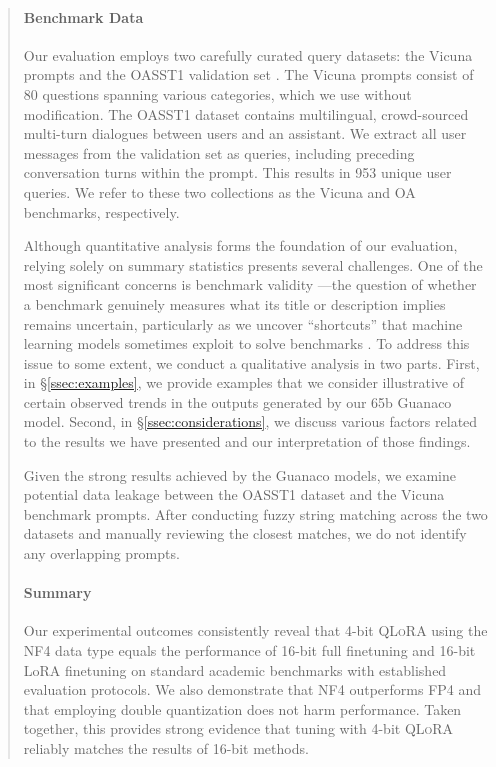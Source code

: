 \begin{quote}
\paragraph{Benchmark Data} Our evaluation employs two carefully curated query datasets: the Vicuna prompts \citep{vicuna2023} and the OASST1 validation set \citep{kopf2023openassistant}. The Vicuna prompts consist of 80 questions spanning various categories, which we use without modification. The OASST1 dataset contains multilingual, crowd-sourced multi-turn dialogues between users and an assistant. We extract all user messages from the validation set as queries, including preceding conversation turns within the prompt. This results in 953 unique user queries. We refer to these two collections as the Vicuna and OA benchmarks, respectively.

Although quantitative analysis forms the foundation of our evaluation, relying solely on summary statistics presents several challenges. One of the most significant concerns is benchmark validity \citep{liao2021we}—the question of whether a benchmark genuinely measures what its title or description implies remains uncertain, particularly as we uncover “shortcuts” that machine learning models sometimes exploit to solve benchmarks \citep{gururangan2018annotation, poliak2018hypothesis}. To address this issue to some extent, we conduct a qualitative analysis in two parts. First, in \S\ref{ssec:examples}, we provide examples that we consider illustrative of certain observed trends in the outputs generated by our 65b {Guanaco} model. Second, in \S\ref{ssec:considerations}, we discuss various factors related to the results we have presented and our interpretation of those findings.

Given the strong results achieved by the {Guanaco} models, we examine potential data leakage between the OASST1 dataset and the Vicuna benchmark prompts. After conducting fuzzy string matching across the two datasets and manually reviewing the closest matches, we do not identify any overlapping prompts.

\paragraph{Summary} Our experimental outcomes consistently reveal that 4-bit \textsc{QLoRA} using the NF4 data type equals the performance of 16-bit full finetuning and 16-bit LoRA finetuning on standard academic benchmarks with established evaluation protocols. We also demonstrate that NF4 outperforms FP4 and that employing double quantization does not harm performance. Taken together, this provides strong evidence that tuning with 4-bit \textsc{QLoRA} reliably matches the results of 16-bit methods.


\end{quote}
